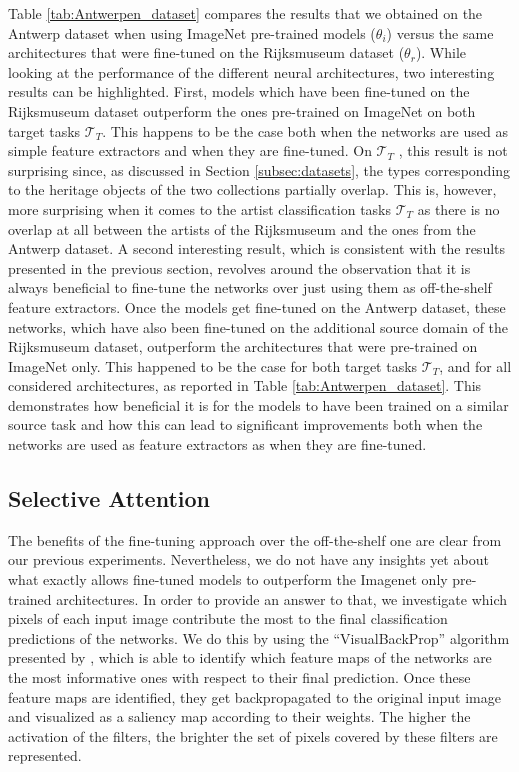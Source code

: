 Table \ref{tab:Antwerpen_dataset} compares the results that we obtained on the Antwerp dataset when using ImageNet pre-trained models ($\theta_{i}$) versus the same architectures that were fine-tuned on the Rijksmuseum dataset ($\theta_{r}$). While looking at the performance of the different neural architectures, two interesting results can be highlighted. First, models which have been fine-tuned on the Rijksmuseum dataset outperform the ones pre-trained on ImageNet on both target tasks $\mathcal{T}_T$. This happens to be the case both when the networks are used as simple feature extractors and when they are fine-tuned. On $\mathcal{T}_T$ , this result is not surprising since, as discussed in Section \ref{subsec:datasets}, the types corresponding to the heritage objects of the two collections partially overlap. This is, however, more surprising when it comes to the artist classification tasks $\mathcal{T}_T$  as there is no overlap at all between the artists of the Rijksmuseum and the ones from the Antwerp dataset.
A second interesting result, which is consistent with the results presented in the previous section, revolves around the observation that it is always beneficial to fine-tune the networks over just using them as off-the-shelf feature extractors. Once the models get fine-tuned on the Antwerp dataset, these networks, which have also been fine-tuned on the additional source domain of the Rijksmuseum dataset, outperform the architectures that were pre-trained on ImageNet only. This happened to be the case for both target tasks $\mathcal{T}_T$, and for all considered architectures, as reported in Table \ref{tab:Antwerpen_dataset}. This demonstrates how beneficial it is for the models to have been trained on a similar source task and how this can lead to significant improvements both when the networks are used as feature extractors as when they are fine-tuned. 



\subsection{Selective Attention}

The benefits of the fine-tuning approach over the off-the-shelf one are clear from our previous experiments. Nevertheless, we do not have any insights yet about what exactly allows fine-tuned models to outperform the Imagenet only pre-trained architectures. In order to provide an answer to that, we investigate which pixels of each input image contribute the most to the final classification predictions of the networks. We do this by using the ``VisualBackProp'' algorithm presented by \cite{bojarski2016visualbackprop}, which is able to identify which feature maps of the networks are the most informative ones with respect to their final prediction. Once these feature maps are identified, they get backpropagated to the original input image and visualized as a saliency map according to their weights. The higher the activation of the filters, the brighter the set of pixels covered by these filters are represented.

